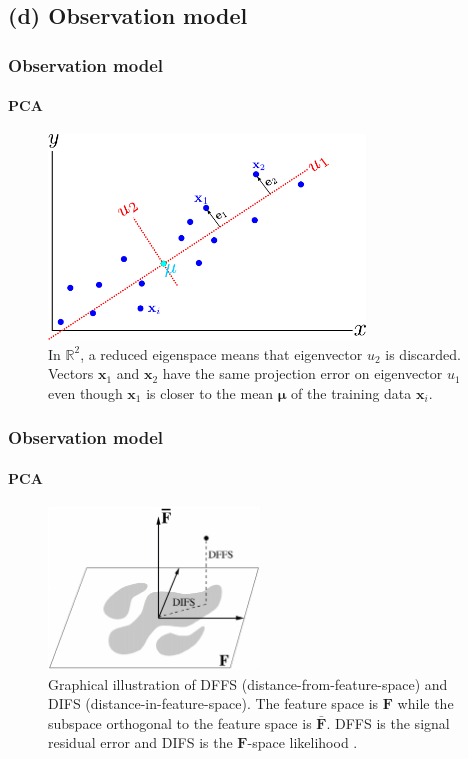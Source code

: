 \subsection{(d) Observation model}
\begin{frame}
\frametitle{Observation model}
\framesubtitle{PCA}
\logoCSIPCPL\mypagenum
\begin{figure}
\centering
\includegraphics[width=0.75\textwidth]{thesis/PRML_PCA_problem.pdf}
\caption{In $\mathbb{R}^2$, a reduced eigenspace means that eigenvector $u_2$ is discarded.  Vectors $\mathbf{x}_1$ and $\mathbf{x}_2$ have the same projection error on eigenvector $u_1$ even though $\mathbf{x}_1$ is closer to the mean $\boldsymbol\mu$ of the training data $\mathbf{x}_i$.}
\label{fig:PRML_PCA_problem}
\end{figure}
\end{frame}


\begin{frame}
\frametitle{Observation model}
\framesubtitle{PCA}
\logoCSIPCPL\mypagenum
\begin{figure}[t]
\centering
\includegraphics[width=0.5\textwidth]{thesis/1998_JNL_ProbVisLearning_Moghaddam_fig3.png}
\caption{Graphical illustration of DFFS (distance-from-feature-space) and DIFS (distance-in-feature-space).  The feature space is $\mathbf{F}$ while the subspace orthogonal to the feature space is $\bar{\mathbf{F}}$.  DFFS is the signal residual error and DIFS is the $\mathbf{F}$-space likelihood \cite{1997_JNL_EigenTRK_Moghaddam}.}
\label{fig:1997_JNL_DIFSDFFS_Moghaddam}
\end{figure}
\end{frame}


